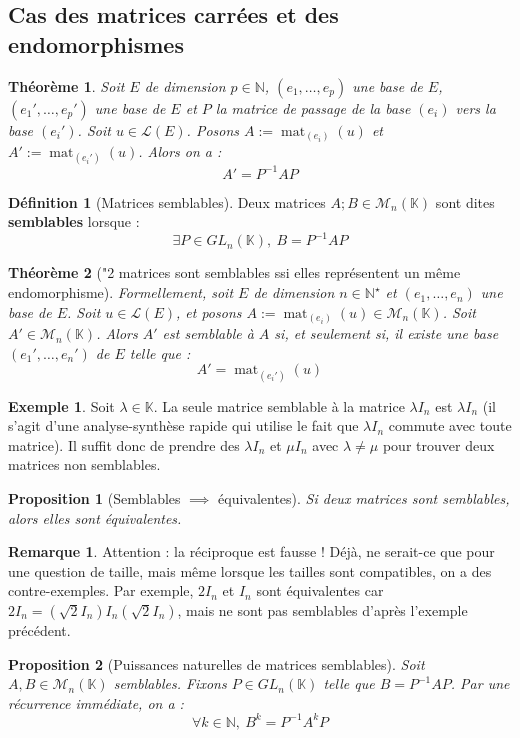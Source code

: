 \documentclass[french]{book}
\newcommand{\N}{\mathbb{N}}
\newcommand{\K}{\mathbb{K}}
\newcommand{\st}{^\star}
\newcommand{\inv}{^{-1}}
\theoremstyle{plain}
\newtheorem{thm}{Théorème}[chapter]
\newtheorem{prop}{Proposition}[chapter]
\theoremstyle{definition}
\newtheorem{dfn}{Définition}[chapter]
\newtheorem{exa}{Exemple}[chapter]
\newtheorem{rmq}{Remarque}[chapter]
\theoremstyle{remark}
\DeclareMathOperator{\mat}{mat}
\begin{document}
\subsection{Cas des matrices carrées et des endomorphismes}
\begin{thm}
	Soit $E$ de dimension $p\in\N$, $(e_1,\ldots,e_p)$ une base de $E$, $(e_1',\ldots,e_p')$ une base de $E$ et $P$ la matrice de passage de la base $(e_i)$ vers la base $(e_i')$. Soit $u\in\mathcal{L}(E)$. Posons $A:=\mat_{(e_i)}(u)$ et $A':=\mat_{(e_i')}(u)$. Alors on a : $$A'=P\inv A P$$
\end{thm}
\begin{dfn}[Matrices semblables]
	Deux matrices $A;B\in\mathcal{M}_n(\K)$ sont dites \textbf{semblables} lorsque : $$\exists P\in GL_n(\K),\ B=P\inv AP$$
\end{dfn}
\begin{thm}["2 matrices sont semblables ssi elles représentent un même endomorphisme]
	Formellement, soit $E$ de dimension $n\in\N\st$ et $(e_1,\ldots,e_n)$ une base de $E$. Soit $u\in\mathcal{L}(E)$, et posons $A:=\mat_{(e_i)}(u)\in\mathcal{M}_n(\K)$. Soit $A'\in\mathcal{M}_n(\K)$. Alors $A'$ est semblable à $A$ si, et seulement si, il existe une base $(e_1',\ldots,e_n')$ de $E$ telle que : $$A'=\mat_{(e_i')}(u)$$
\end{thm}
\begin{exa}
	Soit $\lambda\in\K$. La seule matrice semblable à la matrice $\lambda I_n$ est $\lambda I_n$ (il s'agit d'une analyse-synthèse rapide qui utilise le fait que $\lambda I_n$ commute avec toute matrice). Il suffit donc de prendre des $\lambda I_n$ et $\mu I_n$ avec $\lambda\ne\mu$ pour trouver deux matrices non semblables.
\end{exa}
\begin{prop}[Semblables $\implies$ équivalentes]
	Si deux matrices sont semblables, alors elles sont équivalentes.
\end{prop}
\begin{rmq}
	Attention : la réciproque est fausse ! Déjà, ne serait-ce que pour une question de taille, mais même lorsque les tailles sont compatibles, on a des contre-exemples. Par exemple, $2I_n$ et $I_n$ sont équivalentes car $2I_n=(\sqrt{2}I_n)I_n(\sqrt{2}I_n)$, mais ne sont pas semblables d'après l'exemple précédent.
\end{rmq}
\begin{prop}[Puissances naturelles de matrices semblables]
	Soit $A,B\in\mathcal{M}_n(\K)$ semblables. Fixons $P\in GL_n(\K)$ telle que $B=P\inv AP$. Par une récurrence immédiate, on a : $$\forall k\in\N,\ B^k=P\inv A^kP$$
\end{prop}
\end{document}
